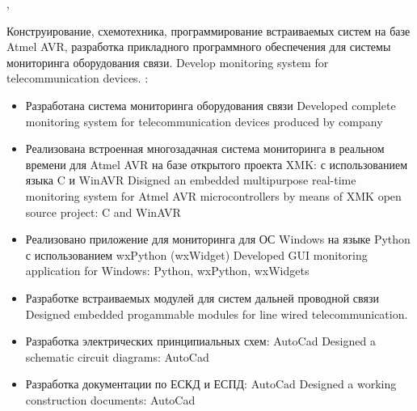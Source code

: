 \documentclass[11pt,a4paper,sans, russian]{moderncv}        %
\begin{document}
{\designengineer}
{\protect{}}
{\cityperm, \country}{}
{
{Конструирование, схемотехника, программирование встраиваемых систем на базе Atmel AVR, разработка прикладного программного обеспечения для системы мониторинга оборудования связи.}
{Develop monitoring system for telecommunication devices.}\newline{}
\achievements:
\begin{itemize}
	\item {}
		{Разработана система мониторинга оборудования связи}
		{Developed complete monitoring system for telecommunication devices produced by company }
	\item {}
		{Реализована встроенная многозадачная система мониторинга в реальном времени для Atmel AVR на базе открытого проекта XMK: с использованием языка C и WinAVR}
		{Disigned an embedded multipurpose real-time monitoring system for Atmel AVR microcontrollers by means of XMK open source project: C and WinAVR}
	\item {}
		{Реализовано приложение для мониторинга для ОС Windows на языке Python с использованием wxPython (wxWidget)}
		{Developed GUI monitoring application for Windows: Python, wxPython, wxWidgets}
	\item {}
		{Разработке встраиваемых модулей для систем дальней проводной связи}
		{Designed embedded progammable modules for line wired telecommunication.}
	\item {}
		{Разработка электрических принципиальных схем: AutoCad}
		{Designed a schematic circuit diagrams: AutoCad}
	\item {}
		{Разработка документации по ЕСКД и ЕСПД: AutoCad}
		{Designed a working construction documents: AutoCad}
\end{itemize}
}
\end{document}
